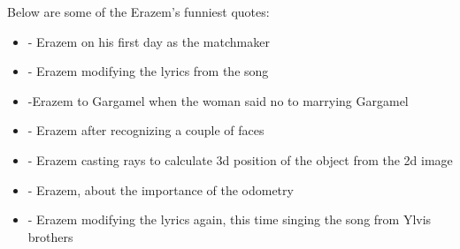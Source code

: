 \documentclass[12pt,a4paper]{article}
\begin{document}

	Below are some of the Erazem's funniest quotes: 
	\begin{itemize}
		\item {} - Erazem on his first day as the matchmaker
		\item {} - Erazem modifying the lyrics from the song
		\item {} -Erazem to Gargamel when the woman said no to marrying Gargamel
		\item {} - Erazem after recognizing a couple of faces
		\item {} - Erazem casting rays to calculate 3d position of the object from the 2d image
		\item {} - Erazem, about the importance of the odometry
		\item {} - Erazem modifying the lyrics again, this time singing the song from Ylvis brothers 
	\end{itemize}
	
\end{document}

